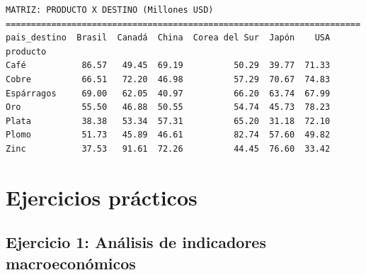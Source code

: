 \documentclass[
  doc,
  floatsintext,
  longtable,
  a4paper,
  nolmodern,
  notxfonts,
  notimes,
  12pt,
  colorlinks=true,linkcolor=blue,citecolor=blue,urlcolor=blue]{apa7}
\begin{document}
\begin{verbatim}
MATRIZ: PRODUCTO X DESTINO (Millones USD)
======================================================================
pais_destino  Brasil  Canadá  China  Corea del Sur  Japón    USA
producto                                                        
Café           86.57   49.45  69.19          50.29  39.77  71.33
Cobre          66.51   72.20  46.98          57.29  70.67  74.83
Espárragos     69.00   62.05  40.97          66.20  63.74  67.99
Oro            55.50   46.88  50.55          54.74  45.73  78.23
Plata          38.38   53.34  57.31          65.20  31.18  72.10
Plomo          51.73   45.89  46.61          82.74  57.60  49.82
Zinc           37.53   91.61  72.26          44.45  76.60  33.42
\end{verbatim}

\section{Ejercicios prácticos}\label{ejercicios-pruxe1cticos}

\subsection{Ejercicio 1: Análisis de indicadores
macroeconómicos}\label{ejercicio-1-anuxe1lisis-de-indicadores-macroeconuxf3micos}
\end{document}
